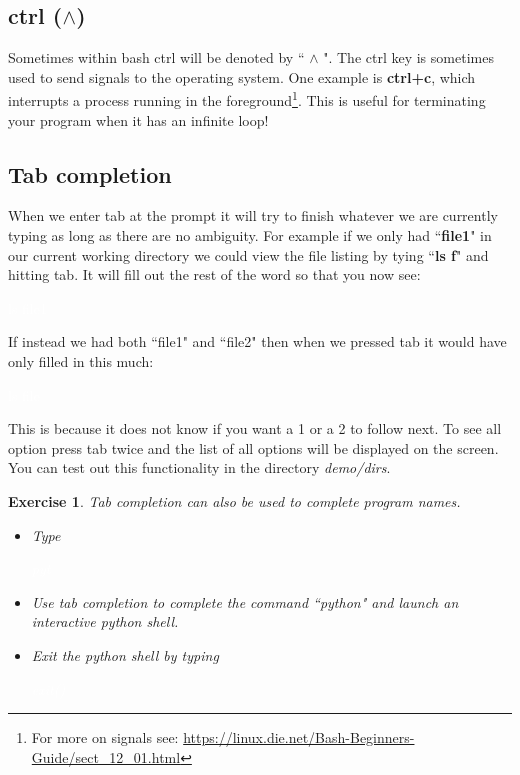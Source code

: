 \documentclass[oneside]{book}
\newcommand{\commandline}[1]{\begin{center} \colorbox{Dark}{\textcolor{white}{#1}} \end{center}}
\newtheorem{ex}{Exercise}[chapter]
\begin{document}
\subsection{ctrl ($\wedge$)}
Sometimes within bash ctrl will be denoted by `` $\wedge$ ". The ctrl key is sometimes used to send signals to the operating system. One example is \textbf{ctrl+c}, which interrupts a process running in the foreground\footnote{For more on signals see:  \url{https://linux.die.net/Bash-Beginners-Guide/sect_12_01.html}}. This is useful for terminating your program when it has an infinite loop!


\subsection{Tab completion}
When we enter tab at the prompt it will try to finish whatever we are currently typing as long as there are no ambiguity. For example if we only had ``\textbf{file1}" in our current working directory we could view the file listing by tying ``\textbf{ls f}" and hitting tab. It will fill out the rest of the word so that you now see:
\commandline{ls file1}
If instead we had both ``file1" and ``file2" then when we pressed tab it would have only filled in this much:
\commandline{ls file}
This is because it does not know if you want a 1 or a 2 to follow next. To see all option press tab twice and the list of all options will be displayed on the screen. You can test out this functionality in the directory \textit{demo/dirs}.\\

\begin{ex}
    Tab completion can also be used to complete program names.
    \begin{itemize} 
        \item Type \commandline{pyt}
        \item Use tab completion to complete the command ``python" and launch an interactive python shell.
        \item Exit the python shell by typing \commandline{exit()}
    \end{itemize}
\end{ex}
\end{document}
